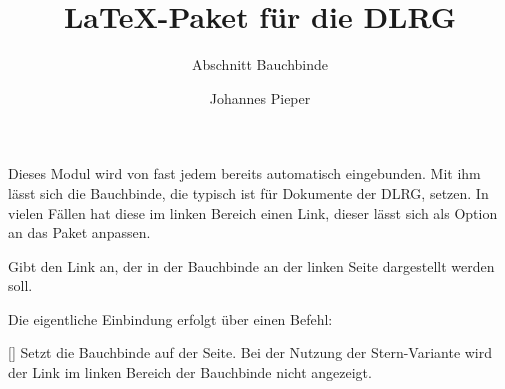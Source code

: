 \documentclass[
    a4paper,
    12pt,
    parskip=half,
]{scrartcl}
\title{\LaTeX{}-Paket für die DLRG}
\subtitle{Abschnitt Bauchbinde}
\author{Johannes Pieper}
\begin{document}
    Dieses Modul wird von fast jedem bereits automatisch eingebunden. Mit ihm lässt sich die Bauchbinde, die typisch ist für Dokumente der DLRG, setzen. In vielen Fällen hat diese im linken Bereich einen Link, dieser lässt sich als Option an das Paket anpassen.

    \begin{options}
            Gibt den Link an, der in der Bauchbinde an der linken Seite dargestellt werden soll.
    \end{options}

    Die eigentliche Einbindung erfolgt über einen Befehl:

    \begin{commands}
        [\sarg]
            Setzt die Bauchbinde auf der Seite. Bei der Nutzung der Stern-Variante wird der Link im linken Bereich der Bauchbinde nicht angezeigt.
    \end{commands}
\end{document}
